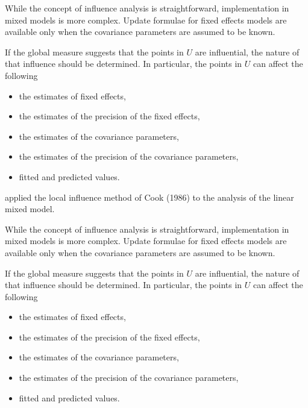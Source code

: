 \documentclass[12pt, a4paper]{article}
\begin{document}
			While the concept of influence analysis is straightforward, implementation in mixed models is more complex. Update formulae for fixed effects models are available only when the covariance parameters are assumed to be known.
			
			If the global measure suggests that the points in $U$ are influential, the nature of that influence should be determined. In particular, the points in $U$ can affect the following
			
			\begin{itemize}
				\item the estimates of fixed effects,
				\item the estimates of the precision of the fixed effects,
				\item the estimates of the covariance parameters,
				\item the estimates of the precision of the covariance parameters,
				\item fitted and predicted values.
			\end{itemize}
			

			
			
			 \citet{Beckman} applied the local influence method of Cook (1986) to the analysis of the linear mixed model.
			
			While the concept of influence analysis is straightforward, implementation in mixed models is more complex. Update formulae for fixed effects models are available only when the covariance parameters are assumed to be known.
			
			If the global measure suggests that the points in $U$ are influential, the nature of that influence should be determined. In particular, the points in $U$ can affect the following
			
			\begin{itemize}
				\item the estimates of fixed effects,
				\item the estimates of the precision of the fixed effects,
				\item the estimates of the covariance parameters,
				\item the estimates of the precision of the covariance parameters,
				\item fitted and predicted values.
			\end{itemize}
\end{document}
